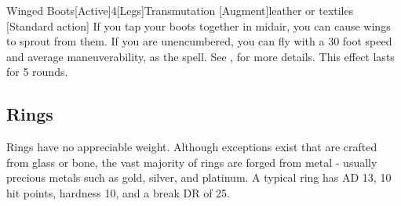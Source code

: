 \begin{magicitemdef}{Winged Boots}[Active]{4}[Legs]{Transmutation [Augment]}{leather or textiles}
    [Standard action] If you tap your boots together in midair, you can cause wings to sprout from them.
    If you are unencumbered, you can fly with a 30 foot speed and average maneuverability, as the  spell.
    See , for more details.
    This effect lasts for 5 rounds.
\end{magicitemdef}

\subsection{Rings}

 Rings have no appreciable weight.
Although exceptions exist that are crafted from glass or bone, the vast majority of rings are forged from metal - usually precious metals such as gold, silver, and platinum.
A typical ring has AD 13, 10 hit points, hardness 10, and a break DR of 25.

\begin{comment}
\begin{dtable}
    \lcaption{Rings}
    \begin{dtabularx}{\columnwidth}{>{\lcol}X l}
        Ring & Market Price \\
        \hline
        Protection \plus1 & 2,000 gp \\
        Feather falling & 2,200 gp \\
        Climbing & 2,500 gp \\
        Jumping & 2,500 gp \\
        Sustenance & 2,500 gp \\
        Swimming & 2,500 gp \\
        Mind shielding & 8,000 gp \\
        Protection \plus2 & 8,000 gp \\
        Climbing, improved & 10,000 gp \\
        Jumping, improved & 10,000 gp \\
        Swimming, improved & 10,000 gp \\
        Energy resistance, minor & 12,000 gp \\
        Protection \plus3 & 18,000 gp \\
        Energy resistance, major & 28,000 gp \\
        Protection \plus4 & 32,000 gp \\
        Energy resistance, greater & 44,000 gp \\
        Protection \plus5 & 50,000 gp \\
    \end{dtabularx}
\end{dtable}
\end{comment}

